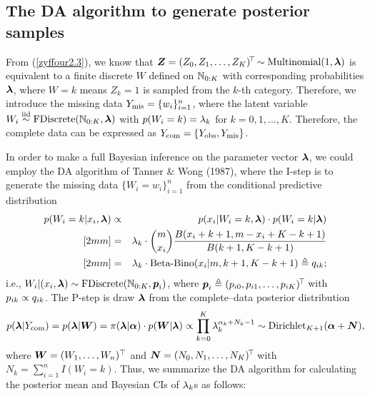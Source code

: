 \subsection{The DA algorithm to generate posterior samples}     %

From (\ref{zyffour2.3}), we know that ${\boldsymbol{Z}} =(Z_0, Z_1, \dots, Z_K)^{\!\top\!} \sim \mbox{Multinomial}(1,{\boldsymbol{\lambda}})$ is equivalent to a finite discrete \trv $W$ defined on ${\mathbb{N}}_{0:K}$ with corresponding probabilities ${\boldsymbol{\lambda}}$, where $W = k$ means $Z_k  = 1$ is sampled from the $k$-th category. Therefore, we introduce the missing data $Y_{\rm mis} = \{w_i\}_{i=1}^n$, where the latent variable $W_i \stackrel{{\rm iid}}{\sim} \mbox{FDiscrete}({\mathbb{N}}_{0:K}, {\boldsymbol{\lambda}})$ with $p(W_i=k) = \lambda_k$ for $k=0,1,\ldots,K$. Therefore, the complete data can be expressed as $Y_{\rm com} = \{Y_{\rm obs},Y_{\rm mis}\}$.

In order to make a full Bayesian inference on the parameter vector ${\boldsymbol{\lambda}}$, we could employ the DA algorithm of Tanner \& Wong (1987), where the \textsf{I-step} is to generate the missing data $\{W_i=w_i\}_{i=1}^n$ from the conditional predictive distribution
\begin{eqnarray*}
    p(W_i = k | x_i, {\boldsymbol{\lambda}}) &\propto & p(x_i | W_i = k, {\boldsymbol{\lambda}}) \cdot p(W_i = k | {\boldsymbol{\lambda}}) \\ [2mm]
    &=& \lambda_k \cdot \binom{m}{x_i} \frac{B(x_i + k + 1, m - x_i + K - k + 1)}{B(k + 1, K - k + 1)} \\ [2mm]
    &=& \lambda_k \cdot \mbox{Beta-Bino}(x_i | m, k + 1, K - k + 1) \triangleq q_{ik};
\end{eqnarray*}
i.e., $W_i | (x_i, {\boldsymbol{\lambda}}) \sim \mbox{FDiscrete}({\mathbb{N}}_{0:K}, {\boldsymbol{p}}_i)$, where
${\boldsymbol{p}}_i \triangleq (p_{i0}, p_{i1}, \dots, p_{iK})^{\!\top\!}$ with $p_{ik} \propto q_{ik}$. The \textsf{P-step} is draw ${\boldsymbol{\lambda}}$ from the complete--data posterior distribution
\begin{eqnarray}
    p({\boldsymbol{\lambda}} | Y_{\rm com}) = p({\boldsymbol{\lambda}} | {\boldsymbol{W}}) = \pi({\boldsymbol{\lambda}} | {\boldsymbol{\alpha}}) \cdot p({\boldsymbol{W}} | {\boldsymbol{\lambda}}) \propto \prod_{k=0}^K \lambda_k^{\alpha_k + N_k - 1} \sim \mbox{\rm Dirichlet}_{K+1}({\boldsymbol{\alpha}} + {\boldsymbol{N}}), \nonumber
\end{eqnarray}
where ${\boldsymbol{W}} = (W_1, \ldots, W_n)^\top$ and ${\boldsymbol{N}} = (N_0, N_1, \ldots,N_K)^{\!\top\!}$ with $N_k = \sum_{i=1}^n I(W_i = k)$. Thus, we summarize the DA algorithm for calculating the posterior mean and Bayesian CIs of $\lambda_k$s as follows:

